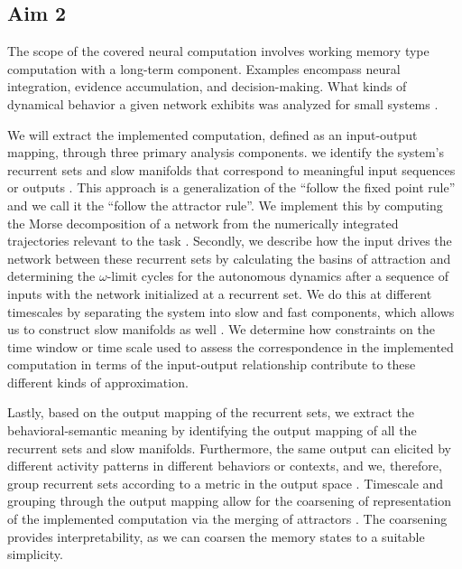 \documentclass[12pt,letterpaper, onecolumn]{article}
\theoremstyle{definition}
\theoremstyle{remark}
\begin{document}
\subsection*{Aim 2}
The scope of the covered neural computation involves working memory type computation with a long-term component. Examples encompass neural integration, evidence accumulation, and decision-making.
What kinds of dynamical behavior a given network exhibits was analyzed for small systems \citep{beer1995ctrnn, beer1995interaction, beer1995computational, beer2006, beer2023}. %


We will extract the implemented computation, defined as an input-output mapping, through three primary analysis components.
we identify the system's recurrent sets and slow manifolds that correspond to meaningful input sequences or outputs \citep{goudar2018}. This approach is a generalization of the ``follow the fixed point rule'' and we call it the ``follow the attractor rule''. We implement this by computing the Morse decomposition of a network from the numerically integrated trajectories relevant to the task \citep{mischaikow1999, arai2009database}.
Secondly, we describe how the input drives the network between these recurrent sets by calculating the basins of attraction and determining the $\omega$-limit cycles for the autonomous dynamics after a sequence of inputs with the network initialized at a recurrent set. We do this at different timescales by separating the system into slow and fast components, which allows us to construct slow manifolds as well \citep{jones1995, kuehn2015}.
We determine how constraints on the time window or time scale used to assess the correspondence in the implemented computation in terms of the input-output relationship contribute to these different kinds of approximation.


Lastly, based on the output mapping of the recurrent sets, we extract the behavioral-semantic meaning by identifying the output mapping of all the recurrent sets and slow manifolds. Furthermore, the same output can elicited by different activity patterns in different behaviors or contexts, and we, therefore, group recurrent sets according to a metric in the output space \citep{athalye2023, myers2022}.
Timescale and grouping through the output mapping allow for the coarsening of representation of the implemented computation via the merging of attractors \citep{braun2010}.
The coarsening provides interpretability, as we can coarsen the memory states to a suitable simplicity.
\end{document}
